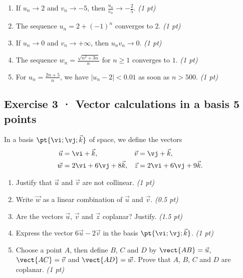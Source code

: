 \begin{enumerate}

\item If $u_n\to 2$ and $v_n\to-5$, then $\frac{u_n}{v_n}\to-\frac{2}{5}$. \hfill\textit{(1 pt)}

\item The sequence $u_n=2+(-1)^n$ converges to $2$. \hfill\textit{(1 pt)}

\item If $u_n\to0$ and $v_n\to+\infty$, then $u_nv_n\to0$. \hfill\textit{(1 pt)}

\item The sequence $w_n=\frac{\sqrt{n^2+3n}}{n}$ for $n\ge1$ converges to $1$. \hfill\textit{(1 pt)}

\item For $u_n=\frac{2n+5}{n}$, we have $|u_n-2|<\num{0,01}$ as soon as $n> 500$. \hfill\textit{(1 pt)}

\end{enumerate}

\mxnewpage{}

\subsection*{Exercise 3 · Vector calculations in a basis \hfill 5 points}In a basis $\pt{\vi;\vj;\vec k}$ of space, we define the vectors
\[\begin{aligned}\vec u&=\vi+\vec k,&\vec v&=\vj+\vec k,\\
\vec w&=2\vi+6\vj+8\vec k,&\vec z&=2\vi+6\vj+9\vec k.\end{aligned}\]

\begin{enumerate}

\item Justify that $\vec u$ and $\vec v$ are not collinear. \hfill\textit{(1 pt)}

\item Write $\vec w$ as a linear combination of $\vec u$ and $\vec v$. \hfill\textit{(0.5 pt)}

\item Are the vectors $\vec u$, $\vec v$ and $\vec z$ coplanar? Justify. \hfill\textit{(1.5 pt)}

\item Express the vector $6\vec u-2\vec v$ in the basis $\pt{\vi;\vj;\vec k}$. \hfill\textit{(1 pt)}

\item Choose a point $A$, then define $B$, $C$ and $D$ by $\vect{AB}=\vec u$, $\vect{AC}=\vec v$ and $\vect{AD}=\vec w$. Prove that $A$, $B$, $C$ and $D$ are coplanar. \hfill\textit{(1 pt)}

\end{enumerate}

